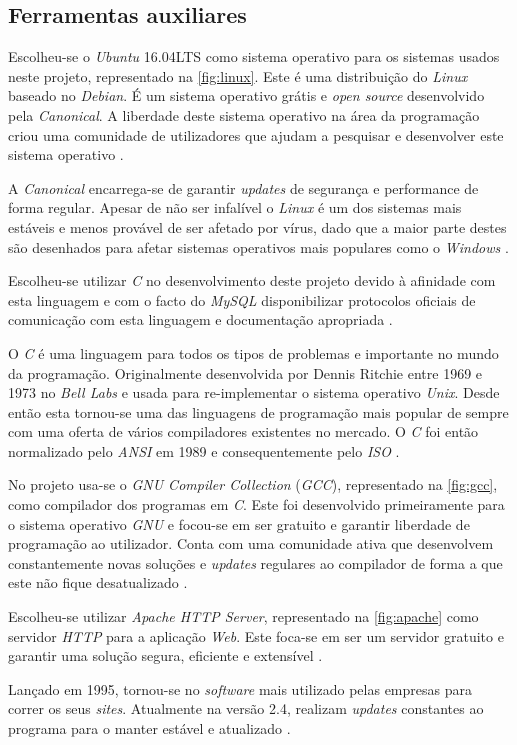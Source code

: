 \documentclass[11pt,twoside,a4paper]{report}
\begin{document}
\subsection{Ferramentas auxiliares}
Escolheu-se o \textit{Ubuntu} 16.04LTS como sistema operativo para os sistemas usados neste projeto, representado na \autoref{fig:linux}. Este é uma distribuição do \textit{Linux} baseado no \textit{Debian}. É um sistema operativo grátis e \textit{open source} desenvolvido pela \textit{Canonical}. A liberdade deste sistema operativo na área da programação criou uma comunidade de utilizadores que ajudam a pesquisar e desenvolver este sistema operativo \cite{ubuntu}.\par 
A \textit{Canonical} encarrega-se de garantir \textit{updates} de segurança e performance de forma regular. Apesar de não ser infalível o \textit{Linux} é um dos sistemas mais estáveis e menos provável de ser afetado por vírus, dado que a maior parte destes são desenhados para afetar sistemas operativos mais populares como o \textit{Windows} \cite{ubuntu}.\par
Escolheu-se utilizar \textit{C} no desenvolvimento deste projeto devido à afinidade com esta linguagem e com o facto do \textit{MySQL} disponibilizar protocolos oficiais de comunicação com esta linguagem e documentação apropriada \cite{mysql}.\par
O \textit{C} é uma linguagem para todos os tipos de problemas e importante no mundo da programação. Originalmente desenvolvida por Dennis Ritchie entre 1969 e 1973 no \textit{Bell Labs} e usada para re-implementar o sistema operativo \textit{Unix}. Desde então esta tornou-se uma das linguagens de programação mais popular de sempre com uma oferta de vários compiladores existentes no mercado. O \textit{C} foi então normalizado pelo \textit{ANSI} em 1989 e consequentemente pelo \textit{ISO} \cite{c}.\par 
No projeto usa-se o \textit{GNU Compiler Collection} (\textit{GCC}), representado na \autoref{fig:gcc}, como compilador dos programas em \textit{C}. Este foi desenvolvido primeiramente para o sistema operativo \textit{GNU} e focou-se em ser gratuito e garantir liberdade de programação ao utilizador. Conta com uma comunidade ativa que desenvolvem constantemente novas soluções e \textit{updates} regulares ao compilador de forma a que este não fique desatualizado \cite{gcc}.\par 
Escolheu-se utilizar \textit{Apache HTTP Server}, representado na \autoref{fig:apache} como servidor \textit{HTTP} para a aplicação \textit{Web}. Este foca-se em ser um servidor gratuito e garantir uma solução segura, eficiente e extensível \cite{apache}.\par
Lançado em 1995, tornou-se no \textit{software} mais utilizado pelas empresas para correr os seus \textit{sites}. Atualmente na versão 2.4, realizam \textit{updates} constantes ao programa para o manter estável e atualizado \cite{apache}.
\end{document}
